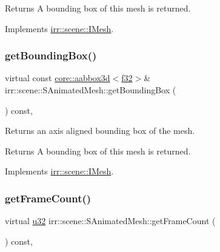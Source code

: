 \begin{DoxyReturn}{Returns}
A bounding box of this mesh is returned. 
\end{DoxyReturn}


Implements \hyperlink{classirr_1_1scene_1_1IMesh_ada6ecee9cbebed8bb67fd92872552ea0}{irr\+::scene\+::\+I\+Mesh}.

\mbox{\label{structirr_1_1scene_1_1SAnimatedMesh_a1494406ce8f11d47fd1e3b4af825e88f}} 
\subsubsection{\texorpdfstring{get\+Bounding\+Box()}{getBoundingBox()}\hspace{0.1cm}{\footnotesize\ttfamily [2/2]}}
{\footnotesize\ttfamily virtual const \hyperlink{classirr_1_1core_1_1aabbox3d}{core\+::aabbox3d}$<$\hyperlink{namespaceirr_a0277be98d67dc26ff93b1a6a1d086b07}{f32}$>$\& irr\+::scene\+::\+S\+Animated\+Mesh\+::get\+Bounding\+Box (\begin{DoxyParamCaption}{ }\end{DoxyParamCaption}) const\hspace{0.3cm}{\ttfamily [inline]}, {\ttfamily [virtual]}}



Returns an axis aligned bounding box of the mesh. 

\begin{DoxyReturn}{Returns}
A bounding box of this mesh is returned. 
\end{DoxyReturn}


Implements \hyperlink{classirr_1_1scene_1_1IMesh_ada6ecee9cbebed8bb67fd92872552ea0}{irr\+::scene\+::\+I\+Mesh}.

\mbox{\label{structirr_1_1scene_1_1SAnimatedMesh_a58d8940d3002792194c74e209a5f2949}} 
\subsubsection{\texorpdfstring{get\+Frame\+Count()}{getFrameCount()}\hspace{0.1cm}{\footnotesize\ttfamily [1/2]}}
{\footnotesize\ttfamily virtual \hyperlink{namespaceirr_a0416a53257075833e7002efd0a18e804}{u32} irr\+::scene\+::\+S\+Animated\+Mesh\+::get\+Frame\+Count (\begin{DoxyParamCaption}{ }\end{DoxyParamCaption}) const\hspace{0.3cm}{\ttfamily [inline]}, {\ttfamily [virtual]}}



